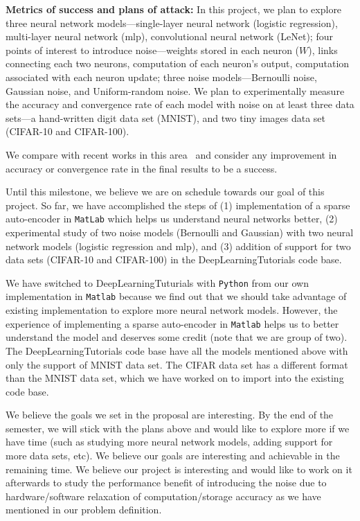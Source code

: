 {\bf Metrics of success and plans of attack:}
In this project, we plan to explore three neural network models---single-layer
neural network (logistic regression), multi-layer neural network (mlp),
convolutional neural network (LeNet); four points of interest to introduce
noise---weights stored in each neuron ($W$), links connecting each two neurons,
computation of each neuron's output, computation associated with each neuron
update; three noise models---Bernoulli noise, Gaussian noise, and Uniform-random
noise. We plan to experimentally measure the accuracy and convergence rate of
each model with noise on at least three data sets---a hand-written digit data
set (MNIST), and two tiny images data set (CIFAR-10 and CIFAR-100).

We compare with recent works in this area~\cite{srivastava2013improving,
hinton2012improving, wan2013dropconnect, goodfellow13maxout} and consider any
improvement in accuracy or convergence rate in the final results to be a
success.

Until this milestone, we believe we are on schedule towards our goal of this
project. So far, we have accomplished the steps of (1) implementation of a
sparse auto-encoder in {\tt MatLab} which helps us understand neural networks
better, (2) experimental study of two noise models (Bernoulli and Gaussian) with
two neural network models (logistic regression and mlp), and (3) addition of
support for two data sets (CIFAR-10 and CIFAR-100) in the DeepLearningTutorials
code base.

We have switched to DeepLearningTuturials with {\tt Python} from our own
implementation in {\tt Matlab} because we find out that we should take advantage
of existing implementation to explore more neural network models. However, the
experience of implementing a sparse auto-encoder in {\tt Matlab} helps us to
better understand the model and deserves some credit (note that we are group of
two). The DeepLearningTutorials code base have all the models mentioned above
with only the support of MNIST data set. The CIFAR data set has a different
format than the MNIST data set, which we have worked on to import into the
existing code base.

We believe the goals we set in the proposal are interesting. By the end of the
semester, we will stick with the plans above and would like to explore more if
we have time (such as studying more neural network models, adding support for
more data sets, etc). We believe our goals are interesting and achievable in the
remaining time. We believe our project is interesting and would like to work on
it afterwards to study the performance benefit of introducing the noise due to
hardware/software relaxation of computation/storage accuracy as we have
mentioned in our problem definition.


